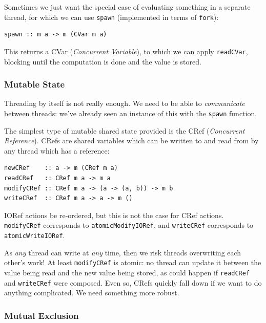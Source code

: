 Sometimes we just want the special case of evaluating something in a
separate thread, for which we can use \texttt{spawn} (implemented in
terms of \texttt{fork}):

\begin{verbatim}
spawn :: m a -> m (CVar m a)
\end{verbatim}

This returns a CVar (\textit{Concurrent Variable}), to which we can
apply \texttt{readCVar}, blocking until the computation is done and
the value is stored.


\subsubsection*{Mutable State}
\label{conc-crefs}

Threading by itself is not really enough. We need to be able to
\textit{communicate} between threads: we've already seen an instance
of this with the \texttt{spawn} function.

The simplest type of mutable shared state provided is the CRef
(\textit{Concurrent Reference}). CRefs are shared variables which can
be written to and read from by any thread which has a reference:

\begin{verbatim}
newCRef    :: a -> m (CRef m a)
readCRef   :: CRef m a -> m a
modifyCRef :: CRef m a -> (a -> (a, b)) -> m b
writeCRef  :: CRef m a -> a -> m ()
\end{verbatim}

\begin{departure}
  IORef actions be re-ordered\cite{ioref}, but this is not the case
  for CRef actions. \texttt{modifyCRef} corresponds to
  \texttt{atomicModifyIORef}, and \texttt{writeCRef} corresponds to
  \texttt{atomicWriteIORef}.
\end{departure}

As \textit{any} thread can write at \textit{any} time, then we risk
threads overwriting each other's work! At least \texttt{modifyCRef} is
atomic: no thread can update it between the value being read and the
new value being stored, as could happen if \texttt{readCRef} and
\texttt{writeCRef} were composed. Even so, CRefs quickly fall down if
we want to do anything complicated. We need something more robust.

\subsubsection*{Mutual Exclusion}
\label{sec:prelims-dejafu-conc-cvars}

